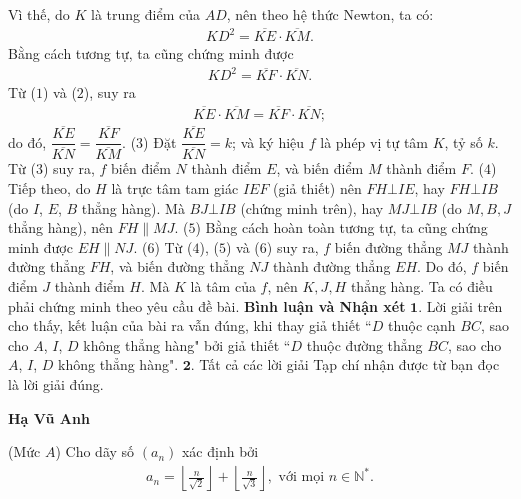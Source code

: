 \begin{multicols}{2}
	Vì thế, do $K$ là trung điểm của $AD$, nên theo hệ thức Newton, ta có:
	\begin{align*}
		K{D^2} = \overline {KE}  \cdot \overline {KM} . \tag{$1$}
	\end{align*}
	Bằng cách tương tự, ta cũng chứng minh được
	\begin{align*}
		K{D^2} = \overline {KF}  \cdot \overline {KN} . \tag{$2$}
	\end{align*}
	Từ ($1$) và ($2$), suy ra
	\begin{align*}
		\overline {KE}  \cdot \overline {KM}  = \overline {KF}  \cdot \overline {KN} ;
	\end{align*}
	do đó, $\dfrac{{\overline {KE} }}{{\overline {KN} }} = \dfrac{{\overline {KF} }}{{\overline {KM} }}.$ \hfill ($3$)
	\vskip 0.05cm
	Đặt $\dfrac{{\overline {KE} }}{{\overline {KN} }} = k$;  và ký hiệu $f$ là phép vị tự tâm $K$, tỷ số $k$.
	\vskip 0.05cm
	Từ ($3$) suy ra, $f$ biến điểm $N$ thành điểm $E$, và biến điểm $M$ thành điểm $F$. \hfill ($4$)
	\vskip 0.05cm
	Tiếp theo, do $H$ là trực tâm tam giác $IEF$ (giả thiết) nên $FH \bot IE$, hay $FH \bot IB$ (do $I$, $E$, $B$ thẳng hàng). Mà $BJ \bot IB$ (chứng minh trên), hay $MJ \bot IB$ (do $M, B, J$ thẳng hàng), nên $FH \parallel MJ$.   \hfill     ($5$)
	\vskip 0.05cm
	Bằng cách hoàn toàn tương tự, ta cũng chứng minh được $EH \parallel NJ$.  \hfill   ($6$)
	\vskip 0.05cm
	Từ ($4$), ($5$) và ($6$) suy ra, $f$ biến đường thẳng $MJ$ thành đường thẳng $FH$, và biến đường thẳng $NJ$ thành đường thẳng $EH$. Do đó, $f$ biến điểm $J$ thành điểm $H$. Mà $K$ là tâm của $f$, nên $K, J, H$ thẳng hàng. Ta có điều phải chứng minh theo yêu cầu đề bài.
	\vskip 0.05cm
	\textbf{\color{thachthuctoanhoc}Bình luận và Nhận xét}
	\vskip 0.05cm
	$\pmb{1.}$ Lời giải trên cho thấy, kết luận của bài ra vẫn đúng, khi thay giả thiết ``$D$ thuộc cạnh $BC$, sao cho $A$, $I$, $D$ không thẳng hàng" bởi giả thiết ``$D$ thuộc đường thẳng $BC$, sao cho $A$, $I$, $D$ không thẳng hàng".
	\vskip 0.05cm
	$\pmb{2.}$ Tất cả các lời giải Tạp chí nhận được từ bạn đọc là lời giải đúng.
	\begin{flushright}
		\textbf{\color{thachthuctoanhoc}Hạ Vũ Anh}
	\end{flushright}
	{}
	(Mức $A$) Cho dãy số $\left(a_n\right)$  xác định bởi
	\begin{align*}
		{a_n} = \left\lfloor {\frac{n}{{\sqrt 2 }}} \right\rfloor  + \left\lfloor {\frac{n}{{\sqrt 3 }}} \right\rfloor , \text{ với mọi } n \in \mathbb{N^*}.
	\end{align*}

\end{multicols}
